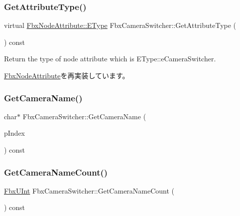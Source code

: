 \subsubsection{\texorpdfstring{Get\+Attribute\+Type()}{GetAttributeType()}}
{\footnotesize\ttfamily virtual \hyperlink{class_fbx_node_attribute_a08e1669d3d1a696910756ab17de56d6a}{Fbx\+Node\+Attribute\+::\+E\+Type} Fbx\+Camera\+Switcher\+::\+Get\+Attribute\+Type (\begin{DoxyParamCaption}{ }\end{DoxyParamCaption}) const\hspace{0.3cm}{\ttfamily [virtual]}}



Return the type of node attribute which is E\+Type\+::e\+Camera\+Switcher. 



\hyperlink{class_fbx_node_attribute_a1c2116756906127145a2b8721fc26752}{Fbx\+Node\+Attribute}を再実装しています。

\mbox{\label{class_fbx_camera_switcher_a9cfc17b2e772a32cdbb0f15fffb18eda}} 
\subsubsection{\texorpdfstring{Get\+Camera\+Name()}{GetCameraName()}}
{\footnotesize\ttfamily char$\ast$ Fbx\+Camera\+Switcher\+::\+Get\+Camera\+Name (\begin{DoxyParamCaption}\item[{\hyperlink{fbxtypes_8h_ae9fb141d8158a730aa85ec5ff2ea3f6b}{Fbx\+U\+Int}}]{p\+Index }\end{DoxyParamCaption}) const}

\mbox{\label{class_fbx_camera_switcher_a5311eac98442cb069497ea8b09b3717d}} 
\subsubsection{\texorpdfstring{Get\+Camera\+Name\+Count()}{GetCameraNameCount()}}
{\footnotesize\ttfamily \hyperlink{fbxtypes_8h_ae9fb141d8158a730aa85ec5ff2ea3f6b}{Fbx\+U\+Int} Fbx\+Camera\+Switcher\+::\+Get\+Camera\+Name\+Count (\begin{DoxyParamCaption}{ }\end{DoxyParamCaption}) const}

